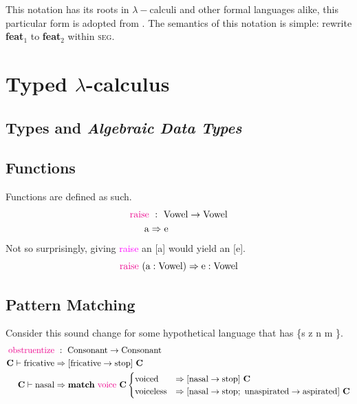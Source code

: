 \documentclass{report}[12pt]
\begin{document}
This notation has its roots in $\lambda-$calculi and other formal languages alike, this particular form is adopted from \cite{tpl}. The semantics of this notation is simple: rewrite \textbf{feat}$_1$ to \textbf{feat}$_2$ within \textsc{seg}.

\section{Typed \texorpdfstring{$\lambda$}--calculus}

\subsection*{Types and \emph{Algebraic Data Types}}

\subsection*{Functions}

Functions are defined as such.
\begin{align*}
\text{\textcolor{magenta}{raise}} &\ :\ \text{Vowel} \rightarrow \text{Vowel} \\
\text{a} & \Rightarrow \text{e} \\
\end{align*}
Not so surprisingly, giving \textcolor{magenta}{raise} an [a] would yield an [e].
\[ \text{\textcolor{magenta}{raise}}\ (\text{a} : \text{Vowel}) \Rightarrow \text{e} : \text{Vowel} \]

\subsection*{Pattern Matching}

Consider this sound change for some hypothetical language that has \{s z n m  \}.
\begin{align*}
  \text{\textcolor{magenta}{obstruentize}} &\ :\ \text{Consonant} \rightarrow \text{Consonant} \\
  \textbf{C} \vdash \text{fricative} & \Rightarrow [\text{fricative} \rightarrow \text{stop}]\ \textbf{C} \\
  \textbf{C} \vdash \text{nasal} & \Rightarrow \textbf{match}\ \text{\textcolor{magenta}{voice}}\ \textbf{C}
                                   \begin{cases}
                                     \text{voiced} & \Rightarrow [\text{nasal} \rightarrow \text{stop}]\ \textbf{C} \\
                                     \text{voiceless} & \Rightarrow [\text{nasal} \rightarrow \text{stop};\ \text{unaspirated} \rightarrow \text{aspirated}]\ \textbf{C} \\
                                   \end{cases}
\end{align*}
\end{document}
